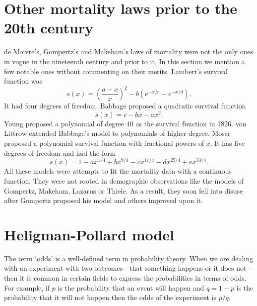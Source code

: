 \documentclass{article}
\numberwithin{equation}{section}
\begin{document}
\section{Other mortality laws prior to the 20th century}\label{s4}
de Moivre's, Gompertz's and Makeham's laws of mortality were not the only
ones in vogue in the nineteenth century and prior to it. In this section we
mention a few notable ones without commenting on their merits. Lambert's
survival function \cite{lambert1776dottrina} was
\begin{equation}\label{s4e1}
s(x) = \left(\frac{a - x}{x}\right)^2 - b\left(e^{-x/c} - e^{-x/d}\right).
\end{equation}
It had four degrees of freedom. Babbage\cite{babbage1823tables} proposed a 
quadratic survival function
\begin{equation}\label{s4e2}
s(x) = c - bx - ax^2.
\end{equation}
Young proposed a polynomial of degree $40$ as the survival function in 
\cite{adler1866memoir} 1826. von Littrow\cite{von1832lebensversicherungen}
extended Babbage's model to polynomials of higher degree. Moser
\cite{moser1839gesetze} proposed a polynomial survival function with 
fractional powers of $x$. It has five degrees of freedom and had the form
\begin{equation}\label{s4e3}
s(x) = 1 - ax^{1/4} + bx^{9/4} - cx^{17/4} - dx^{25/4} + ex^{33/4}.
\end{equation}
All these models were attempts to fit the mortality data with a continuous 
function. They were not rooted in demographic observations like the models
of Gompertz, Makeham, Lazarus or Thiele. As a result, they soon fell into
disuse after Gompertz proposed his model and others improved upon it.

\section{Heligman-Pollard model}\label{s5}
The term `odds' is a well-defined term in probability theory. When we are 
dealing with an experiment with two outcomes - that something happens or 
it does not - then it is common in certain fields to express the 
probabilities in terms of odds.  For example, if $p$ is the probability 
that an event will happen and $q = 1 - p$ is the probability that it will 
not happen then the odds of the experiment is $p/q$. 
\end{document}
